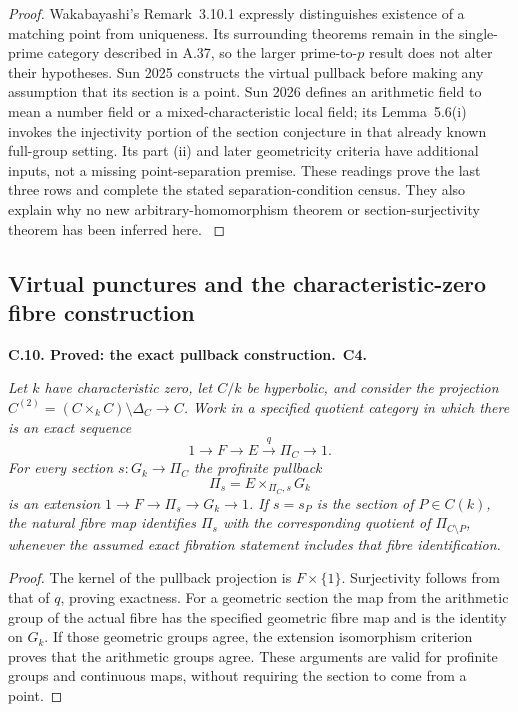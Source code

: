 \documentclass[11pt,a4paper]{article}
\newenvironment{claim}[3]{\par\medskip\noindent\hypertarget{#1}{\textbf{#1. #2.}}\ \textbf{#3.}\par\nopagebreak\smallskip\begingroup\itshape}{\endgroup\par\smallskip}
\begin{document}
\begin{proof}
Wakabayashi's Remark~3.10.1 expressly distinguishes existence
of a matching point from uniqueness. Its surrounding theorems
remain in the single-prime category described in A.37, so
the larger prime-to-$p$ result does not alter their hypotheses.
Sun 2025 constructs the virtual pullback before making any
assumption that its section is a point. Sun 2026 defines an
arithmetic field to mean a number field or a mixed-characteristic
local field; its Lemma~5.6(i) invokes the injectivity portion
of the section conjecture in that already known full-group
setting. Its part (ii) and later geometricity criteria have
additional inputs, not a missing point-separation premise.
These readings prove the last three rows and complete the
stated separation-condition census. They also explain why no
new arbitrary-homomorphism theorem or section-surjectivity
theorem has been inferred here.
\citep[Definition~1.18, \S2, Theorem~3.10,
Corollary~3.11]{LA_Mochizuki2007}
\citep[Theorems~3.9,4.4, Remark~3.10.1]{LA_Wakabayashi2016}
\citep[Definition~3.1, Proposition~3.7, Corollary~3.8,
Theorems~A--C]{LA_Sun2025}
\citep[\S2, Lemma~5.6, Theorem~5.7, Corollary~5.8]{LA_Sun2026}
\end{proof}


\subsection{Virtual punctures and the characteristic-zero fibre construction}

\begin{claim}{C.10}{Proved: the exact pullback construction}{C4}
Let $k$ have characteristic zero, let $C/k$ be hyperbolic, and consider
the projection $C^{(2)}=(C\times_k C)\setminus\Delta_C\to C$.
Work in a specified quotient category in which there is an exact
sequence
\[
 1\longrightarrow F\longrightarrow E\xrightarrow{q}\Pi_C
 \longrightarrow1.
\]
For every section $s:G_k\to\Pi_C$ the profinite pullback
\[
 \Pi_s=E\times_{\Pi_C,s}G_k
\]
is an extension $1\to F\to\Pi_s\to G_k\to1$. If $s=s_P$ is the
section of $P\in C(k)$, the natural fibre map identifies $\Pi_s$ with
the corresponding quotient of $\Pi_{C\setminus P}$, whenever the
assumed exact fibration statement includes that fibre identification.
\end{claim}
\begin{proof}
The kernel of the pullback projection is $F\times\{1\}$. Surjectivity
follows from that of $q$, proving exactness. For a geometric section
the map from the arithmetic group of the actual fibre has the specified
geometric fibre map and is the identity on $G_k$. If those geometric
groups agree, the extension isomorphism criterion proves that the
arithmetic groups agree. These arguments are valid for profinite groups
and continuous maps, without requiring the section to come from a point.
\end{proof}
\end{document}
